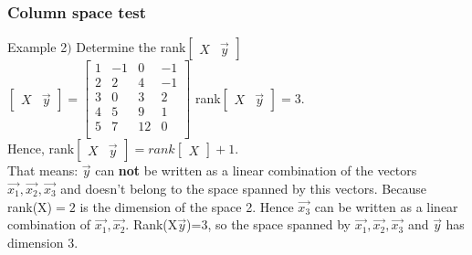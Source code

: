 \begin{frame}
	\frametitle{Column space test}
	\begin{block}{Example}
		2$)$ Determine the rank$\begin{bmatrix}
		X & \overrightarrow{y}\end{bmatrix}$\\
		$\begin{bmatrix}
		X & \overrightarrow{y}\end{bmatrix}=\begin{bmatrix} 
		1 & -1 & 0 & -1\\
		2 & 2 & 4 & -1\\
		3 & 0 & 3 & 2\\
		4 & 5 & 9 & 1\\
		5 & 7 & 12 & 0\\\end{bmatrix}$ \hspace{1cm} rank$\begin{bmatrix}
		X & \overrightarrow{y}\end{bmatrix}=3$.\\
		Hence, rank$\begin{bmatrix}
		X & \overrightarrow{y}\end{bmatrix}=rank\begin{bmatrix}
		X \end{bmatrix}+1$.\\
		That means: $\overrightarrow{y}$ can {\bf not} be written as a linear combination of the vectors $\overrightarrow{x_1},\overrightarrow{x_2},\overrightarrow{x_3}$ and doesn't belong to the space spanned by this vectors. Because rank(X)$=2$ is the dimension of the space 2. Hence $\overrightarrow{x_3}$ can be written as a linear combination of $\overrightarrow{x_1},\overrightarrow{x_2}$. Rank(X$\overrightarrow{y}$)=3, so the space spanned by $\overrightarrow{x_1},\overrightarrow{x_2},\overrightarrow{x_3}$ and $\overrightarrow{y}$ has dimension 3.
	\end{block}
\end{frame}

